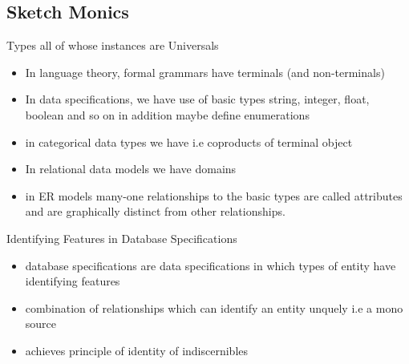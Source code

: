 
\subsection{Sketch Monics}





\begin{frame}{Types all of whose instances are Universals}
\begin{itemize}
\item In language theory, formal grammars have terminals (and non-terminals)
\pause \item In data specifications, we have use of basic types string, integer, float, boolean and so on
              in addition maybe define enumerations 
\pause \item in categorical data types we have  i.e coproducts of terminal object
\pause \item In relational data models we have domains
\pause \item in ER models many-one relationships to the basic types are called attributes and are graphically distinct from other relationships.
\end{itemize}
\end{frame}


\begin{frame}{Identifying Features in Database Specifications}
\begin{itemize}
\item database specifications are data specifications in which types of entity have 
identifying features
\item combination of relationships which can identify an entity unquely
i.e a mono source
\item achieves principle of identity of indiscernibles
\end {itemize}
\end{frame}


